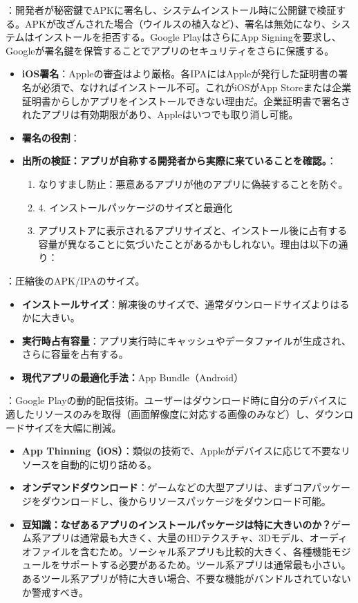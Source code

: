 
：開発者が秘密鍵でAPKに署名し、システムインストール時に公開鍵で検証する。APKが改ざんされた場合（ウイルスの植入など）、署名は無効になり、システムはインストールを拒否する。Google PlayはさらにApp Signingを要求し、Googleが署名鍵を保管することでアプリのセキュリティをさらに保護する。

\begin{itemize}
  \item \textbf{iOS署名}：Appleの審査はより厳格。各IPAにはAppleが発行した証明書の署名が必須で、なければインストール不可。これがiOSがApp Storeまたは企業証明書からしかアプリをインストールできない理由だ。企業証明書で署名されたアプリは有効期限があり、Appleはいつでも取り消し可能。
  \item \textbf{署名の役割}：
  \item \textbf{出所の検証：アプリが自称する開発者から実際に来ていることを確認。}：
  \begin{enumerate}
    \item なりすまし防止：悪意あるアプリが他のアプリに偽装することを防ぐ。
    \item 4. インストールパッケージのサイズと最適化
    \item アプリストアに表示されるアプリサイズと、インストール後に占有する容量が異なることに気づいたことがあるかもしれない。理由は以下の通り：
  \end{enumerate}
\end{itemize}


：圧縮後のAPK/IPAのサイズ。

\begin{itemize}
  \item \textbf{インストールサイズ}：解凍後のサイズで、通常ダウンロードサイズよりはるかに大きい。
  \item \textbf{実行時占有容量}：アプリ実行時にキャッシュやデータファイルが生成され、さらに容量を占有する。
  \item \textbf{現代アプリの最適化手法：}App Bundle（Android）
\end{itemize}

：Google Playの動的配信技術。ユーザーはダウンロード時に自分のデバイスに適したリソースのみを取得（画面解像度に対応する画像のみなど）し、ダウンロードサイズを大幅に削減。

\begin{itemize}
  \item \textbf{App Thinning（iOS）}：類似の技術で、Appleがデバイスに応じて不要なリソースを自動的に切り詰める。
  \item \textbf{オンデマンドダウンロード}：ゲームなどの大型アプリは、まずコアパッケージをダウンロードし、後からリソースパッケージをダウンロード可能。
  \item \textbf{豆知識：なぜあるアプリのインストールパッケージは特に大きいのか？}ゲーム系アプリは通常最も大きく、大量のHDテクスチャ、3Dモデル、オーディオファイルを含むため。ソーシャル系アプリも比較的大きく、各種機能モジュールをサポートする必要があるため。ツール系アプリは通常最も小さい。あるツール系アプリが特に大きい場合、不要な機能がバンドルされていないか警戒すべき。
\end{itemize}

